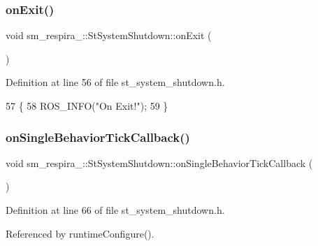\subsubsection{\texorpdfstring{on\+Exit()}{onExit()}}
{\footnotesize\ttfamily void sm\+\_\+respira\+\_\+::\+St\+System\+Shutdown\+::on\+Exit (\begin{DoxyParamCaption}{ }\end{DoxyParamCaption})\hspace{0.3cm}{\ttfamily [inline]}}



Definition at line 56 of file st\+\_\+system\+\_\+shutdown.\+h.


\begin{DoxyCode}
57     \{
58         ROS\_INFO(\textcolor{stringliteral}{"On Exit!"});
59     \}
\end{DoxyCode}
\mbox{\label{structsm__respira__1_1_1StSystemShutdown_af0466e4c8c2527eeb76888d8dfec396c}} 
\subsubsection{\texorpdfstring{on\+Single\+Behavior\+Tick\+Callback()}{onSingleBehaviorTickCallback()}}
{\footnotesize\ttfamily void sm\+\_\+respira\+\_\+::\+St\+System\+Shutdown\+::on\+Single\+Behavior\+Tick\+Callback (\begin{DoxyParamCaption}{ }\end{DoxyParamCaption})\hspace{0.3cm}{\ttfamily [inline]}}



Definition at line 66 of file st\+\_\+system\+\_\+shutdown.\+h.



Referenced by runtime\+Configure().


